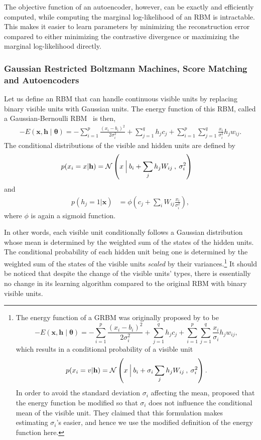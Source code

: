 \documentclass{now}
\newcommand{\vect}[1]{\mathbf{#1}}
\newcommand{\vects}[1]{\boldsymbol{#1}}
\newcommand{\vh}[0]{\vect{h}}
\newcommand{\vx}[0]{\vect{x}}
\newcommand{\TT}[0]{{\vects{\theta}}}
\newcommand{\N}[0]{\mathcal{N}}
\begin{document}
The objective function of an autoencoder, however, can be exactly and
efficiently computed, while computing the marginal log-likelihood of an RBM is
intractable. This makes it easier to learn parameters by minimizing the
reconstruction error compared to either minimizing the contrastive divergence or
maximizing the marginal log-likelihood directly.

\subsubsection{Gaussian Restricted Boltzmann Machines, Score Matching and
Autoencoders}
\label{sec:grbm}

Let us define an RBM that can handle continuous visible units by replacing
binary visible units with Gaussian units.  The energy function of this RBM,
called a Gaussian-Bernoulli RBM~\citep[GRBM,][]{Hinton2006} is then,
\begin{align}
    \label{eq:grbm_energy}
    -E(\vx, \vh \mid \TT) = -\sum_{i=1}^p \frac{(x_i -
    b_i)^2}{2\sigma_i^2} + \sum_{j=1}^q h_j c_j +
    \sum_{i=1}^p \sum_{j=1}^q \frac{x_i}{\sigma_i^2} h_j
    w_{ij}.
\end{align}
The conditional distributions of the visible and hidden units are defined by
\begin{align}
    \label{grbm:conditional_visible}
    p(x_i = x | \vh) &= \N \left(x \:\Bigl|\: b_i + 
    \sum_j h_j W_{ij} \:,\: \sigma_i^2 \right)
\end{align}
and
\begin{align}
    \label{grbm:conditional_hidden}
    p(h_j = 1 | \vx) &= \phi \left( c_j +  \sum_i W_{ij}
    \frac{x_i}{\sigma_i^2} \right),
\end{align}
where $\phi$ is again a sigmoid function.

In other words, each visible unit conditionally follows a Gaussian distribution
whose mean is determined by the weighted sum of the states of the hidden units.
The conditional probability of each hidden unit being one is determined by the
weighted sum of the states of the visible units \textit{scaled} by their
variances.\footnote{
The energy function of a GRBM was originally proposed by \citet{Hinton2006} to
be
\[
    -E(\vx, \vh \mid \TT) = -\sum_{i=1}^p \frac{(x_i -
    b_i)^2}{2\sigma_i^2} + \sum_{j=1}^q h_j c_j +
    \sum_{i=1}^p \sum_{j=1}^q \frac{x_i}{\sigma_i} h_j
    w_{ij},
\]
which results in a conditional probability of a visible unit 
\[
p(x_i = v | \vh) = \N \left(x \:\Bigl|\: b_i + 
\sigma_i \sum_j h_j W_{ij} \:,\: \sigma_i^2 \right).
\]
In order to avoid the standard deviation $\sigma_i$ affecting the mean,
\citet{Cho2011icann} proposed that the energy function be modified so that
$\sigma_i$ does not influence the conditional mean of the visible unit.  They
claimed that this formulation makes estimating $\sigma_i$'s easier, and hence we
use the modified definition of the energy function here.
}
It should be noticed that despite the change of the visible units' types, there
is essentially no change in its learning algorithm compared to the original RBM
with binary visible units.
\end{document}

